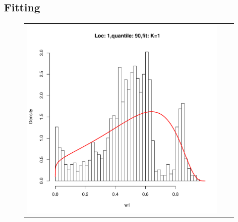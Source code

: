 \subsection{Fitting}


\begin{figure}[h]
\begin{tabular}{ccc}
\includegraphics[width=\textwidth/3]{../img/loc1/quantile90/fit_K1.pdf}
&

\end{tabular}
\end{figure}
